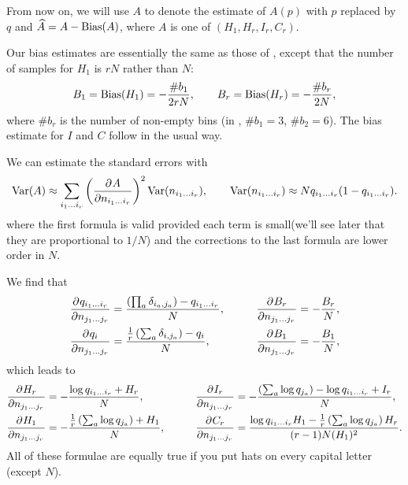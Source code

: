\documentclass[12pt]{article}
\begin{document}
From now on, we will use $A$ to denote the estimate of $A(p)$ with $p$ replaced by $q$ and $\widehat{A}=A-\operatorname{Bias}(A)$, where $A$ is one of $(H_1,H_r,I_r,C_r)$.

Our bias estimates are essentially the same as those of \cite{1999PhyD..125..285R}, except that the number of samples for $H_1$ is $rN$ rather than $N$:
%
\begin{equation}\label{eq:biasH}
  B_1 = \operatorname{Bias}(H_1) = -\frac{\#b_1}{2rN},
  \qquad
  B_r = \operatorname{Bias}(H_r) = -\frac{\#b_r}{2N},
\end{equation}
%
where $\#b_r$ is the number of non-empty bins (\eg in , $\#b_1=3$, $\#b_2=6$). The bias estimate for $I$ and $C$ follow in the usual way.

We can estimate the standard errors with
%
\begin{equation}\label{eq:stderr}
  \var(A) \approx \sum_{i_1\ldots i_r} \prn{\pdiff{A}{n_{i_1\ldots i_r}}}^2 \var(n_{i_1\ldots i_r}),
  \qquad
  \var(n_{i_1\ldots i_r}) \approx N q_{i_1\ldots i_r}(1-q_{i_1\ldots i_r}).
\end{equation}
%
where the first formula is valid provided each term is small(we'll see later that they are proportional to $1/N$) and the corrections to the last formula are lower order in $N$.

We find that
%
\begin{equation}\label{eq:dqbydn}
  \begin{aligned}
    \pdiff{q_{i_1\ldots i_r}}{n_{j_1\ldots j_r}} &= \frac{\prn{\prod_a \delta_{i_a,j_a}} - q_{i_1\ldots i_r}}{N}, &
    \qquad
    \pdiff{B_{r}}{n_{j_1\ldots j_r}} &= -\frac{B_r}{N},\\
    \pdiff{q_{i}}{n_{j_1\ldots j_r}} &= \frac{\frac{1}{r} \prn{\sum_a \delta_{i,j_a}} - q_{i}}{N}, &
    \pdiff{B_{1}}{n_{j_1\ldots j_r}} &= -\frac{B_1}{N},
   \end{aligned}
\end{equation}
%
which leads to
%
\begin{equation}\label{eq:dhbydn}
  \begin{aligned}
    \pdiff{H_r}{n_{j_1\ldots j_r}} &= -\frac{\log q_{i_1\ldots i_r} + H_r}{N}, &
    \qquad
    \pdiff{I_{r}}{n_{j_1\ldots j_r}} &= -\frac{\prn{\sum_a \log q_{j_a}}-\log q_{i_1\ldots i_r} + I_r}{N}, \\
    \pdiff{H_1}{n_{j_1\ldots j_r}} &= -\frac{\frac{1}{r} \prn{\sum_a \log q_{j_a}} + H_1}{N}, &
    \pdiff{C_{r}}{n_{j_1\ldots j_r}} &= \frac{\log q_{i_1\ldots i_r} H_1 - \frac{1}{r} \prn{\sum_a \log q_{j_a}} H_r}{(r-1)N(H_1)^2}.
   \end{aligned}
\end{equation}
%
All of these formulae are equally true if you put hats on every capital letter (except $N$).
\end{document}

